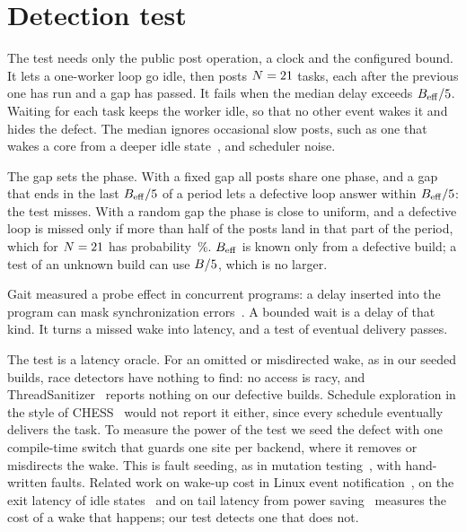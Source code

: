 \section{Detection test}\label{sec:test}

The test needs only the public post operation, a clock and the configured bound. It lets a
one-worker loop go idle, then posts $N = 21$ tasks, each after the previous one has
run and a gap has passed. It fails when the median delay exceeds $B_{\mathrm{eff}}/5$.
Waiting for each task keeps the worker idle, so that no other event wakes it and hides the
defect. The median ignores occasional slow posts, such as one that wakes a core from a deeper
idle state~\cite{schone2015wakeup}, and scheduler noise.

The gap sets the phase. With a fixed gap all posts share one phase, and a gap that ends in the
last $B_{\mathrm{eff}}/5$ of a period lets a defective loop answer within
$B_{\mathrm{eff}}/5$: the test misses. With a random gap the phase is close to uniform, and
a defective loop is missed only if more than half of the posts land in that part of the period,
which for $N = 21$ has probability \WakeBinomialMissPct\,\%. $B_{\mathrm{eff}}$ is known only
from a defective build; a test of an unknown build can use $B/5$, which is no
larger.

Gait measured a probe effect in concurrent programs: a delay inserted into the program can
mask synchronization errors~\cite{gait1986probe}. A bounded wait is a delay of that kind. It
turns a missed wake into latency, and a test of eventual delivery passes.

The test is a latency oracle. For an omitted or misdirected wake, as in our seeded builds, race
detectors have nothing to find: no access is racy, and
ThreadSanitizer~\cite{serebryany2009threadsanitizer} reports nothing on our defective builds.
Schedule exploration in the style of CHESS~\cite{musuvathi2008finding} would not report it
either, since every schedule eventually delivers the task. To measure the power of the test we
seed the defect with one compile-time switch that guards one site per backend, where it removes
or misdirects the wake. This is fault seeding, as in mutation testing~\cite{jia2011analysis},
with hand-written faults. Related work on wake-up cost in Linux event
notification~\cite{nolte2023hawen}, on the exit latency of idle states~\cite{schone2015wakeup}
and on tail latency from power saving~\cite{li2014tales} measures the cost of a wake that
happens; our test detects one that does not.

